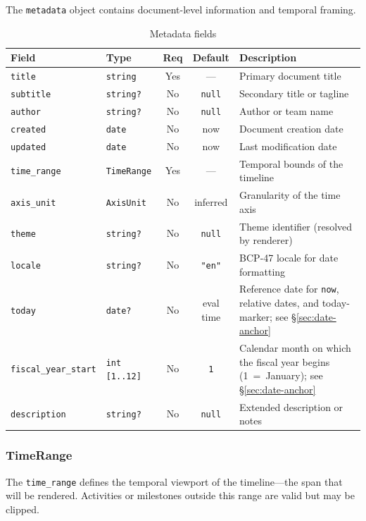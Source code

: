 The \texttt{metadata} object contains document-level information and temporal framing.

\begin{table}[h]
\centering
\small
\begin{tabular}{llccp{4.5cm}}
\toprule
\textbf{Field} & \textbf{Type} & \textbf{Req} & \textbf{Default} & \textbf{Description} \\
\midrule
\texttt{title} & \texttt{string} & Yes & --- & Primary document title \\
\texttt{subtitle} & \texttt{string?} & No & \texttt{null} & Secondary title or tagline \\
\texttt{author} & \texttt{string?} & No & \texttt{null} & Author or team name \\
\texttt{created} & \texttt{date} & No & now & Document creation date \\
\texttt{updated} & \texttt{date} & No & now & Last modification date \\
\texttt{time\_range} & \texttt{TimeRange} & Yes & --- & Temporal bounds of the timeline \\
\texttt{axis\_unit} & \texttt{AxisUnit} & No & inferred & Granularity of the time axis \\
\texttt{theme} & \texttt{string?} & No & \texttt{null} & Theme identifier (resolved by renderer) \\
\texttt{locale} & \texttt{string?} & No & \texttt{"en"} & BCP-47 locale for date formatting \\
\texttt{today} & \texttt{date?} & No & eval time & Reference date for \texttt{now}, relative dates, and today-marker; see \S\ref{sec:date-anchor} \\
\texttt{fiscal\_year\_start} & \texttt{int [1..12]} & No & \texttt{1} & Calendar month on which the fiscal year begins (1~=~January); see \S\ref{sec:date-anchor} \\
\texttt{description} & \texttt{string?} & No & \texttt{null} & Extended description or notes \\
\bottomrule
\end{tabular}
\caption{Metadata fields}
\label{tab:metadata-fields}
\end{table}

\subsubsection{TimeRange}

The \texttt{time\_range} defines the temporal viewport of the timeline---the span that will
be rendered. Activities or milestones outside this range are valid but may be clipped.

